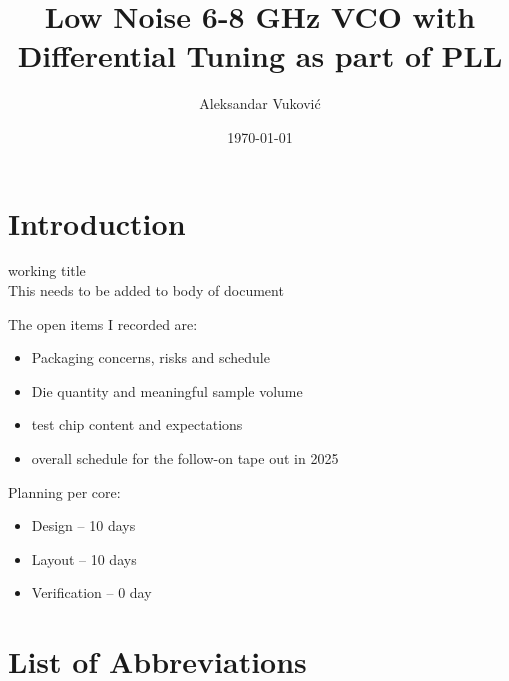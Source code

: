 \documentclass{article}
\title{Low Noise 6-8 GHz VCO with Differential Tuning as part of PLL} %
\author{Aleksandar Vuković} %
\date{\today} %
\begin{document}
\maketitle %


\section*{Introduction}

working title %
\\
This needs to be added to body of document %

The open items I recorded are:
\begin{itemize}
	\item Packaging concerns, risks and schedule
	\item Die quantity and meaningful sample volume
	\item test chip content and expectations
	\item overall schedule for the follow-on tape out in 2025
\end{itemize}

Planning per core:

\begin{itemize}
	\item Design -- 10 days
	\item Layout -- 10 days
	\item Verification -- 0 day
\end{itemize}

\newpage

\section*{List of Abbreviations}




\end{document}
